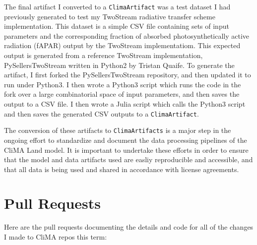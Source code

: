\documentclass[11pt, a4paper]{article}
\begin{document}
The final artifact I converted to a \texttt{ClimaArtifact} was a test dataset
I had previously generated to test my TwoStream radiative transfer scheme
implementation. This dataset is a simple CSV file containing sets of input 
parameters and the corresponding fraction of absorbed photosynthetically active
radiation (fAPAR) output by the TwoStream implementatiom. This expected output
is generated from a reference TwoStream implementation, PySellersTwoStream 
written in Python2 by Tristan Quaife. To generate the artifact, I first forked
the PySellersTwoStream repository, and then updated it to run under Python3.
I then wrote a Python3 script which runs the code in the fork over a large
combinatorial space of input parameters, and then saves the output to a CSV file.
I then wrote a Julia script which calls the Python3 script and then saves the
generated CSV outputs to a \texttt{ClimaArtifact}.

The conversion of these artifacts to \texttt{ClimaArtifacts} is a major step in
the ongoing effort to standardize and document the data processing pipelines of
the CliMA Land model. It is important to undertake these efforts in order to
ensure that the model and data artifacts used are easliy reproducible and 
accessible, and that all data is being used and shared in accordance with 
license agreements. 

\section{Pull Requests}

Here are the pull requests documenting the details and code for all of the
changes I made to CliMA repos this term:
\end{document}
